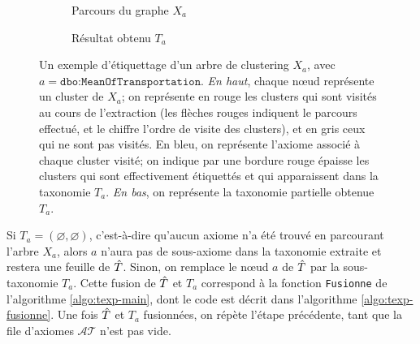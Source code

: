 \begin{figure}
    \centering
    \begin{subfigure}{\textwidth}
        \centering
        
        \caption{Parcours du graphe $X_a$}
        \label{subfig:texp-sbs1}
    \end{subfigure}
    \begin{subfigure}{\textwidth}
        \centering
        
        \caption{Résultat obtenu $T_a$}
        \label{subfig:texp-sbs2}
    \end{subfigure}
    \caption{Un exemple d'étiquettage d'un arbre de clustering $X_a$, avec $a = \texttt{dbo:MeanOfTransportation}$. \textit{En haut}, chaque nœud représente un cluster de $X_a$; on représente en rouge les clusters qui sont visités au cours de l'extraction (les flèches rouges indiquent le parcours effectué, et le chiffre l'ordre de visite des clusters), et en gris ceux qui ne sont pas visités. En bleu, on représente l'axiome associé à chaque cluster visité; on indique par une bordure rouge épaisse les clusters qui sont effectivement étiquettés et qui apparaissent dans la taxonomie $T_a$. \textit{En bas}, on représente la taxonomie partielle obtenue $T_a$.}
    \label{fig:texp-stebbstep}
\end{figure}

%    


Si $T_a = (\varnothing, \varnothing)$, c'est-à-dire qu'aucun axiome n'a été trouvé en parcourant l'arbre $X_a$, alors $a$ n'aura pas de sous-axiome dans la taxonomie extraite et restera une feuille de $\hat{T}$. Sinon, on remplace le nœud $a$ de $\hat{T}$ par la sous-taxonomie $T_a$. Cette fusion de $\hat{T}$ et $T_a$ correspond à la fonction \texttt{Fusionne} de l'algorithme \ref{algo:texp-main}, dont le code est décrit dans l'algorithme \ref{algo:texp-fusionne}. Une fois $\hat{T}$ et $T_a$ fusionnées, on répète l'étape précédente, tant que la file d'axiomes $\mathcal{AT}$ n'est pas vide.

